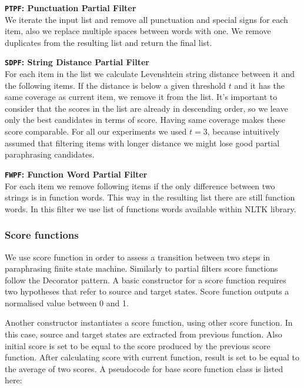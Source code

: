 \begin{flushleft}

\textbf{\texttt{PTPF}: \textbf{Punctuation Partial Filter}} \\
We iterate the input list and remove all punctuation and special signs for each item, also we replace multiple spaces between words with one. We remove duplicates from the resulting list and return the final list.\\
\bigskip 
\bigskip 

\textbf{\texttt{SDPF}: \textbf{String Distance Partial Filter}} \\
For each item in the list we calculate Levenshtein string distance between it and the following items. If the distance is below a given threshold $t$ and it has the same coverage as current item, we remove it from the list. It's important to consider that the scores in the list are already in descending order, so we leave only the best candidates in terms of score. Having same coverage makes these score comparable. For all our experiments we used $t = 3$, because intuitively assumed that filtering items with longer distance we might lose good partial paraphrasing candidates. \\
\bigskip 

\textbf{\texttt{FWPF}: \textbf{Function Word Partial Filter}} \\
For each item we remove following items if the only difference between two strings is in function words. This way in the resulting list there are still function words. In this filter we use list of functions words available within NLTK library. \\
\bigskip 

\end{flushleft} 

\subsubsection{Score functions}

We use score function in order to assess a transition between two steps in paraphrasing finite state machine. Similarly to partial filters score functions follow the Decorator pattern. A basic constructor for a score function requires two hypotheses that refer to source and target states. Score function outputs a normalised value between 0 and 1. 

Another constructor instantiates a score function, using other score function. In this case, source and target states are extracted from previous function. Also initial score is set to be equal to the score produced by the previous score function. After calculating score with current function, result is set to be equal to the average of two scores. A pseudocode for base score function class is listed here:

